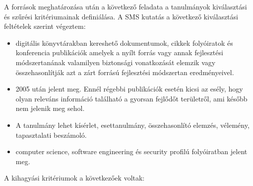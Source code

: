 \documentclass[12pt,magyar,a4paper,oneside]{scrreprt}
\providecommand{\tightlist}{%
  \setlength{\itemsep}{0pt}\setlength{\parskip}{0pt}}
\begin{document}
A források meghatározása után a következő feladata a tanulmányok
kiválasztási és szűrési kritériumainak definiálása. A SMS kutatás a
következő kiválasztási feltételek szerint végeztem:

\begin{itemize}
\tightlist
\item
  digitális könyvtárakban kereshető dokumentumok, cikkek folyóiratok és
  konferencia publikációk amelyek a nyílt forrás vagy annak fejlesztési
  módszertanának valamilyen biztonsági vonatkozását elemzik vagy
  összehasonlítják azt a zárt forrású fejlesztési módszertan
  eredményeivel.
\item
  2005 után jelent meg. Ennél régebbi publikációk esetén kicsi az esély,
  hogy olyan releváns információ található a gyorsan fejlődőt
  területről, ami később nem jelenik meg sehol.
\item
  A tanulmány lehet kísérlet, esettanulmány, összehasonlító elemzés,
  vélemény, tapasztalati beszámoló.
\item
  computer science, software engineering és security profilú
  folyóiratban jelent meg.
\end{itemize}

A kihagyási kritériumok a következőek voltak:
\end{document}
